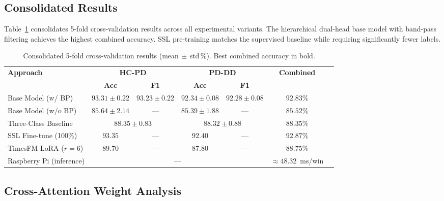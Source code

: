 \documentclass[pmlr]{jmlr}
\begin{document}
\subsection{Consolidated Results}

Table~\ref{tab:summary} consolidates 5-fold cross-validation results
across all experimental variants. The hierarchical dual-head base
model with band-pass filtering achieves the highest combined accuracy.
SSL pre-training matches the supervised baseline while requiring
significantly fewer labels.

\begin{table}[htbp]
\caption{Consolidated 5-fold cross-validation results
         (mean$\,\pm\,$std\,\%). Best combined accuracy in bold.}
\label{tab:summary}
\begin{center}
\begin{tabular}{lcccccc}
\toprule
\multirow{2}{*}{\textbf{Approach}} &
  \multicolumn{2}{c}{\textbf{HC-PD}} &
  \multicolumn{2}{c}{\textbf{PD-DD}} &
  \multirow{2}{*}{\textbf{Combined}} \\
\cmidrule(lr){2-3}\cmidrule(lr){4-5}
& \textbf{Acc} & \textbf{F1}
& \textbf{Acc} & \textbf{F1} & \\
\midrule
Base Model (w/ BP) &
  $93.31{\pm}0.22$ & $93.23{\pm}0.22$ &
  $92.34{\pm}0.08$ & $92.28{\pm}0.08$ & $\mathbf{92.83\%}$ \\
Base Model (w/o BP) &
  $85.64{\pm}2.14$ & --- &
  $85.39{\pm}1.88$ & --- & $85.52\%$ \\
Three-Class Baseline &
  \multicolumn{2}{c}{$88.35{\pm}0.83$} &
  \multicolumn{2}{c}{$88.32{\pm}0.88$} & $88.35\%$ \\
SSL Fine-tune (100\%) &
  $93.35$ & --- &
  $92.40$ & --- & $92.87\%$ \\
TimesFM LoRA ($r{=}6$) &
  $89.70$ & --- &
  $87.80$ & --- & $88.75\%$ \\
\midrule
Raspberry Pi (inference) &
  \multicolumn{4}{c}{---} & ${\approx}48.32$~ms/win \\
\bottomrule
\end{tabular}
\end{center}
\end{table}


\subsection{Cross-Attention Weight Analysis}
\end{document}
